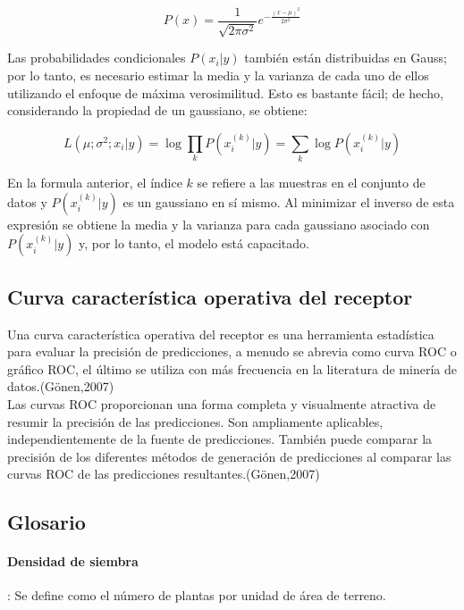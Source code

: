 \[
P\left(x\right) = \frac{1}{\sqrt{2\pi\sigma^{2}}}e^{-\frac{\left(x-\mu\right)^{2}}{2\sigma^{2}}}
\]

Las probabilidades condicionales $P\left(x_{i} | y\right)$ también están distribuidas en Gauss; por lo tanto, es necesario estimar la media y la varianza de cada uno de ellos utilizando el enfoque de máxima verosimilitud. Esto es bastante fácil; de hecho, considerando la propiedad de un gaussiano, se obtiene:

\[
L\left(\mu;\sigma^{2};x_{i} | y\right)=\log\prod_{k}P\left(x_{i}^{\left(k\right)}|y\right)=\sum_{k}\log P\left(x_{i}^{\left(k\right)}|y\right)
\]

En la formula anterior, el índice $k$ se refiere a las muestras en el conjunto de datos y $P\left(x_{i}^{\left(k\right)}|y\right)$ es un gaussiano en sí mismo. Al minimizar el inverso de esta expresión se obtiene la media y la varianza para cada gaussiano asociado con $P\left(x_{i}^{\left(k\right)}|y\right)$ y, por lo tanto, el modelo está capacitado.

\subsection{Curva característica operativa del receptor}

Una curva característica operativa del receptor es una herramienta estadística para evaluar la precisión de predicciones, a menudo se abrevia como curva ROC o gráfico ROC, el último se utiliza con más frecuencia en la literatura de minería de datos.(Gönen,2007)\\

Las curvas ROC proporcionan una forma completa y visualmente atractiva de resumir la precisión de las predicciones. Son ampliamente aplicables, independientemente de la fuente de predicciones. También puede comparar la precisión de los diferentes métodos de generación de predicciones al comparar las curvas ROC de las predicciones resultantes.(Gönen,2007)


\subsection{Glosario}

\paragraph{Densidad de siembra}: Se define como el número de plantas por unidad de área de terreno.

